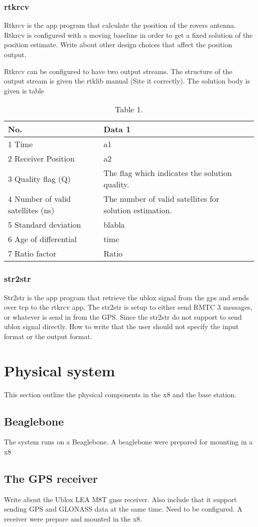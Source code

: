 \subsubsection{rtkrcv}
Rtkrcv is the app program that calculate the position of the rovers antenna. Rtkrcv is configured with a moving baseline in order to get a fixed solution of the position estimate. Write about other design choices that affect the position output. 

Rtkrcv can be configured to have two output streams. The structure of the output stream is given the rtklib manual (Site it correctly). The solution body is given is table 
\begin{table}[!h]
\begin{center}
    \begin{tabular}{ | l | l | l |}
    \hline
    \textbf{No.} & \textbf{Data 1} \\ \hline
     1 Time & a1  \\ \hline
     2 Receiver Position & a2 \\ \hline
     3 Quality flag (Q) & The flag which indicates the solution quality. \\ \hline
     4 Number of valid satellites (ns) & The number of valid satellites for solution estimation. \\ \hline
     5 Standard deviation & blabla \\ \hline
     6 Age of differential & time \\ \hline
     7 Ratio factor & Ratio \\ \hline
    \end{tabular}
\end{center}
\caption{Table 1. }
\label{Tab1}
\end{table}

\subsubsection{str2str}
Str2str is the app program that retrieve the ublox signal from the gps and sends over tcp to the rtkrcv app. The str2str is setup to either send RMTC 3 messages, or whatever is send in from the GPS. Since the str2str do not support to send ublox signal directly. How to write that the user should not specify the input format or the output format.
\section{Physical system}
This section outline the physical components in the x8 and the base station.
\subsection{Beaglebone}
The system runs on a Beaglebone. A beaglebone were prepared for mounting in a x8
\subsection{The GPS receiver}
Write about the Ublox LEA M8T gnss receiver. Also include that it support sending GPS and GLONASS data at the same time. Need to be configured. A receiver were prepare and mounted in the x8.
\cleardoublepage
